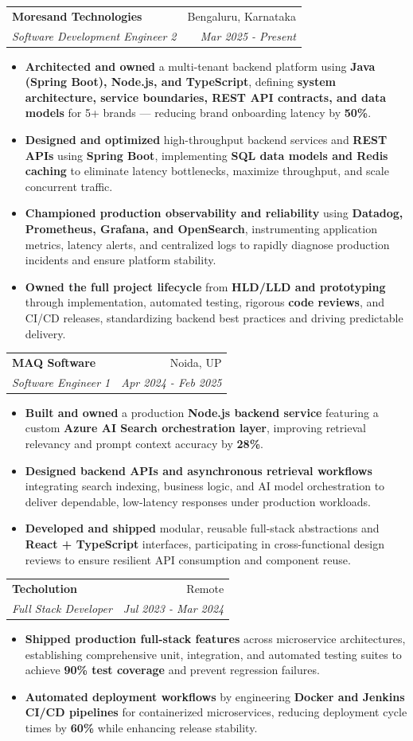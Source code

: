 \documentclass[a4paper,10pt]{article}
\makeatletter
\newcommand{\resumeSubheading}[4]{
  \vspace{-1pt}\item
    \begin{tabular*}{0.97\textwidth}{l@{\extracolsep{\fill}}r}
      \textbf{#1} & #2 \\
      \textit{#3} & \textit{#4} \\
    \end{tabular*}\vspace{-5pt}
}
\newcommand{\resumeItemListStart}{\begin{itemize}}
\newcommand{\resumeItemListEnd}{\end{itemize}\vspace{-5pt}}
\makeatother
\begin{document}
    \resumeSubheading{Moresand Technologies}{Bengaluru, Karnataka}
      {Software Development Engineer 2}{Mar 2025 - Present}
      \resumeItemListStart
        \item \textnormal{\textbf{Architected and owned} a multi-tenant backend platform using \textbf{Java (Spring Boot), Node.js, and TypeScript}, defining \textbf{system architecture, service boundaries, REST API contracts, and data models} for 5+ brands — reducing brand onboarding latency by \textbf{50\%}.}
        \item \textnormal{\textbf{Designed and optimized} high-throughput backend services and \textbf{REST APIs} using \textbf{Spring Boot}, implementing \textbf{SQL data models and Redis caching} to eliminate latency bottlenecks, maximize throughput, and scale concurrent traffic.}
        \item \textnormal{\textbf{Championed production observability and reliability} using \textbf{Datadog, Prometheus, Grafana, and OpenSearch}, instrumenting application metrics, latency alerts, and centralized logs to rapidly diagnose production incidents and ensure platform stability.}
        \item \textnormal{\textbf{Owned the full project lifecycle} from \textbf{HLD/LLD and prototyping} through implementation, automated testing, rigorous \textbf{code reviews}, and CI/CD releases, standardizing backend best practices and driving predictable delivery.}
      \resumeItemListEnd

    \resumeSubheading{MAQ Software}{Noida, UP}
      {Software Engineer 1}{Apr 2024 - Feb 2025}
      \resumeItemListStart
        \item \textnormal{\textbf{Built and owned} a production \textbf{Node.js backend service} featuring a custom \textbf{Azure AI Search orchestration layer}, improving retrieval relevancy and prompt context accuracy by \textbf{28\%}.}
        \item \textnormal{\textbf{Designed backend APIs and asynchronous retrieval workflows} integrating search indexing, business logic, and AI model orchestration to deliver dependable, low-latency responses under production workloads.}
        \item \textnormal{\textbf{Developed and shipped} modular, reusable full-stack abstractions and \textbf{React + TypeScript} interfaces, participating in cross-functional design reviews to ensure resilient API consumption and component reuse.}
      \resumeItemListEnd

    \resumeSubheading{Techolution}{Remote}
      {Full Stack Developer}{Jul 2023 - Mar 2024}
      \resumeItemListStart
        \item \textnormal{\textbf{Shipped production full-stack features} across microservice architectures, establishing comprehensive unit, integration, and automated testing suites to achieve \textbf{90\% test coverage} and prevent regression failures.}
        \item \textnormal{\textbf{Automated deployment workflows} by engineering \textbf{Docker and Jenkins CI/CD pipelines} for containerized microservices, reducing deployment cycle times by \textbf{60\%} while enhancing release stability.}
      \resumeItemListEnd
\end{document}
